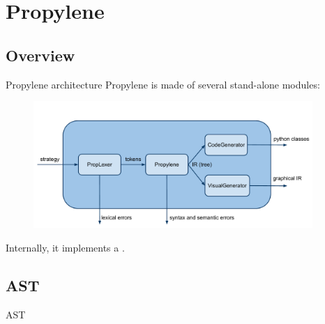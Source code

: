 \section{Propylene}

\subsection{Overview}
\begin{frame}{Propylene architecture}
  Propylene is made of several stand-alone modules:
  \begin{figure}[!h]
    \begin{center}
      \includegraphics[width=300pt]{img/propylene.pdf}
    \end{center}
  \end{figure}
  Internally, it implements a .
\end{frame}


\subsection{AST}
\begin{frame}{AST}  
    
%
\N\N
\end{frame}




